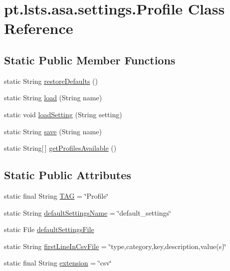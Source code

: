 \hypertarget{classpt_1_1lsts_1_1asa_1_1settings_1_1Profile}{}\section{pt.\+lsts.\+asa.\+settings.\+Profile Class Reference}
\label{classpt_1_1lsts_1_1asa_1_1settings_1_1Profile}
\subsection*{Static Public Member Functions}
\begin{DoxyCompactItemize}
\item 
static String \hyperlink{classpt_1_1lsts_1_1asa_1_1settings_1_1Profile_add507f3a61d6118e5c3d69cd25988258}{restore\+Defaults} ()
\item 
static String \hyperlink{classpt_1_1lsts_1_1asa_1_1settings_1_1Profile_a4fb4dbd8ec09de17231b3b12b2e55354}{load} (String name)
\item 
static void \hyperlink{classpt_1_1lsts_1_1asa_1_1settings_1_1Profile_a9cac4e092ff968e1f9d55528cd8ea17b}{load\+Setting} (String setting)
\item 
static String \hyperlink{classpt_1_1lsts_1_1asa_1_1settings_1_1Profile_a754a6bb95163f47447bc4df516fd09ce}{save} (String name)
\item 
static String\mbox{[}$\,$\mbox{]} \hyperlink{classpt_1_1lsts_1_1asa_1_1settings_1_1Profile_a2ff4fde8864722fe463d3c5a653518dd}{get\+Profiles\+Available} ()
\end{DoxyCompactItemize}
\subsection*{Static Public Attributes}
\begin{DoxyCompactItemize}
\item 
static final String \hyperlink{classpt_1_1lsts_1_1asa_1_1settings_1_1Profile_a6e84bd737cf1fd83b07f0f306b70b710}{T\+A\+G} = \char`\"{}Profile\char`\"{}
\item 
static String \hyperlink{classpt_1_1lsts_1_1asa_1_1settings_1_1Profile_a5ca440f54ce3ac78f7ea00ecd6cd16fe}{default\+Settings\+Name} = \char`\"{}default\+\_\+settings\char`\"{}
\item 
static File \hyperlink{classpt_1_1lsts_1_1asa_1_1settings_1_1Profile_a2167ba64067e5386f3cd1242c2132538}{default\+Settings\+File}
\item 
static String \hyperlink{classpt_1_1lsts_1_1asa_1_1settings_1_1Profile_a7d8087f7e815d9f9fc6e839e8d08d82c}{first\+Line\+In\+Csv\+File} = \char`\"{}type,category,key,description,value(s)\char`\"{}
\item 
static final String \hyperlink{classpt_1_1lsts_1_1asa_1_1settings_1_1Profile_a436c9b9aa032eb20632476c9369d09fb}{extension} = \char`\"{}csv\char`\"{}
\end{DoxyCompactItemize}


